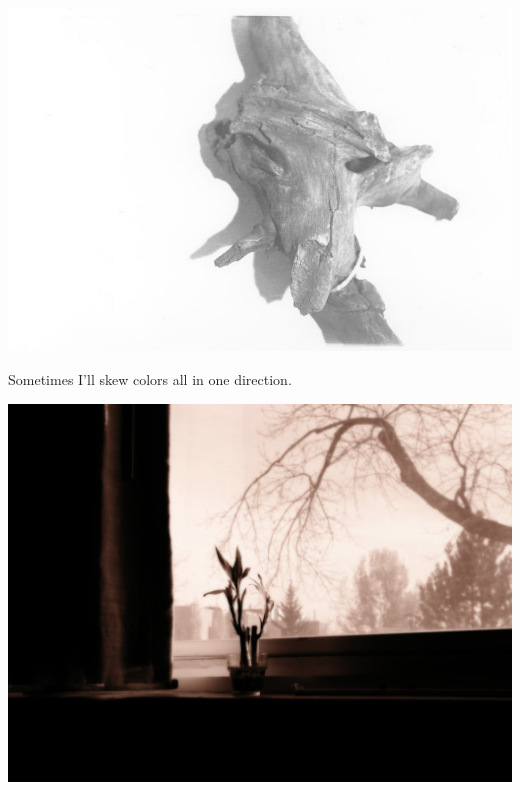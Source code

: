 \noindent\includegraphics[width=7in]{../static/color/bw3.jpg}

\vfill
\newpage

Sometimes I'll skew colors all in one direction.
\vfill

\noindent\includegraphics[width=7in]{../static/color/window_view.png}

\vfill
\newpage

